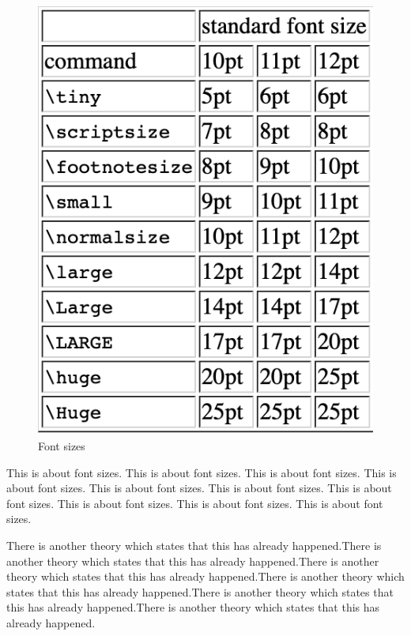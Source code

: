 \documentclass[letterpaper,12pt]{article}%
\begin{document}
\begin{figure}[h!]
\centering
\includegraphics[scale=1]{FontSizes.png}
\caption{Font sizes}
\label{fig:font}
\end{figure}

\begin{huge} %

This is about font sizes. This is about font sizes. This is about font sizes. This is about font sizes. This is about font sizes. This is about font sizes. This is about font sizes. This is about font sizes. This is about font sizes. This is about font sizes. 
\end{huge}

\vspace{.05in}

There is another theory which states that this has already happened.There is another theory which states that this has already happened.There is another theory which states that this has already happened.There is another theory which states that this has already happened.There is another theory which states that this has already happened.There is another theory which states that this has already happened.
\end{document}
